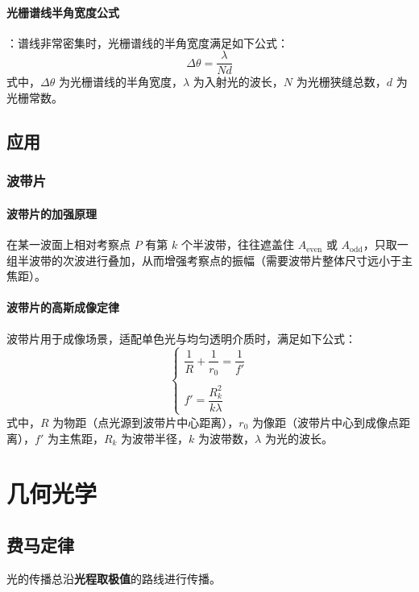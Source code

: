 \documentclass{article}
\begin{document}
	\paragraph{光栅谱线半角宽度公式}：谱线非常密集时，光栅谱线的半角宽度满足如下公式：
	\[
	\Delta\theta = \frac{\lambda}{Nd}
	\]
	式中，\(\Delta\theta\) 为光栅谱线的半角宽度，\(\lambda\) 为入射光的波长，\(N\) 为光栅狭缝总数，\(d\) 为光栅常数。
	
	\subsection{应用}
	
	\subsubsection{波带片}
	
	\paragraph{波带片的加强原理}
	
	在某一波面上相对考察点 \(P\) 有第 \(k\) 个半波带，往往遮盖住 \(A_{\text{even}}\) 或 \(A_{\text{odd}}\)，只取一组半波带的次波进行叠加，从而增强考察点的振幅（需要波带片整体尺寸远小于主焦距）。
	
	\paragraph{波带片的高斯成像定律}
	
	波带片用于成像场景，适配单色光与均匀透明介质时，满足如下公式：
	\[
	\begin{cases}
		\dfrac{1}{R} + \dfrac{1}{r_0} = \dfrac{1}{f'} \\
		\\
		f' = \dfrac{R_k^2}{k\lambda}
	\end{cases}
	\]
	式中，\(R\) 为物距（点光源到波带片中心距离），\(r_0\) 为像距（波带片中心到成像点距离），\(f'\) 为主焦距，\(R_k\) 为波带半径，\(k\) 为波带数，\(\lambda\) 为光的波长。
	
	
	\section{几何光学}
	\subsection{费马定律}
	光的传播总沿\textbf{光程取极值}的路线进行传播。
	
\end{document}
